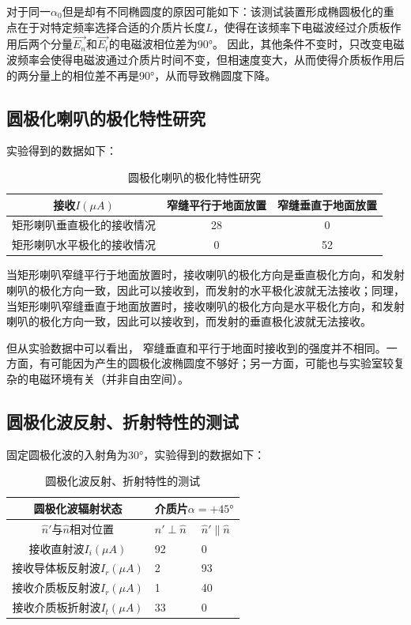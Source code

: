 \documentclass[UTF8]{ctexart}
\begin{document}
对于同一$\alpha_0$但是却有不同椭圆度的原因可能如下：该测试装置形成椭圆极化的重点在于对特定频率选择合适的介质片长度$L$，使得在该频率下电磁波经过介质板作用后两个分量$\vec{E_n}$和$\vec{E_t}$的电磁波相位差为90°。
    因此，其他条件不变时，只改变电磁波频率会使得电磁波通过介质片时间不变，但相速度变大，从而使得介质板作用后的两分量上的相位差不再是90°，从而导致椭圆度下降。

\subsection{圆极化喇叭的极化特性研究}
实验得到的数据如下：
\begin{table}[H]
    \centering
    \renewcommand{\arraystretch}{1.5}
    \caption{圆极化喇叭的极化特性研究}
    \begin{tabular}{|c|c|c|}\hline
        接收$I(\mu A)$&窄缝平行于地面放置&窄缝垂直于地面放置\\\hline
        矩形喇叭垂直极化的接收情况&28&0\\\hline
        矩形喇叭水平极化的接收情况&0&52\\\hline
    \end{tabular}
\end{table}

当矩形喇叭窄缝平行于地面放置时，接收喇叭的极化方向是垂直极化方向，和发射喇叭的极化方向一致，因此可以接收到，而发射的水平极化波就无法接收；同理，
当矩形喇叭窄缝垂直于地面放置时，接收喇叭的极化方向是水平极化方向，和发射喇叭的极化方向一致，因此可以接收到，而发射的垂直极化波就无法接收。

但从实验数据中可以看出，
窄缝垂直和平行于地面时接收到的强度并不相同。一方面，有可能因为产生的圆极化波椭圆度不够好；另一方面，可能也与实验室较复杂的电磁环境有关（并非自由空间）。

\subsection{圆极化波反射、折射特性的测试}
固定圆极化波的入射角为30°，实验得到的数据如下：
\begin{table}[H]
    \centering
    \renewcommand{\arraystretch}{1.5}
    \caption{圆极化波反射、折射特性的测试}
    \begin{tabular}{|c|p{3cm}<{\centering}|p{3cm}<{\centering}|}\hline
        圆极化波辐射状态&\multicolumn{2}{c|}{介质片$\alpha=+45°$}\\\hline
        $\hat{n}'$与$\hat{n}$相对位置&$\hat{n}'\perp\hat{n}$&$\hat{n}'\parallel\hat{n}$\\\hline
        接收直射波$I_i(\mu A)$&92&0\\\hline
        接收导体板反射波$I_r(\mu A)$&2&93\\\hline
        接收介质板反射波$I_r(\mu A)$&1&40\\\hline
        接收介质板折射波$I_t(\mu A)$&33&0\\\hline
    \end{tabular}
\end{table}
\end{document}
